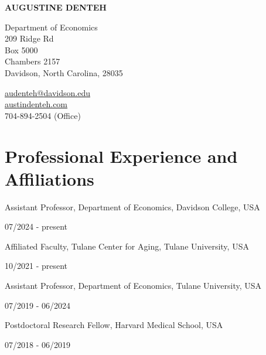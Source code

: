 \documentclass[12pt,letterpaper]{article}
\def\name{Augustine Denteh}
\newcommand{\titlefont}[1]{{\titleface\bfseries\Large\MakeUppercase{#1}}}
\renewenvironment{itemize}{
	\begin{list}{}{
			\setlength{\leftmargin}{1em}
			\setlength{\itemsep}{0.15em}
			\setlength{\parskip}{0pt}
			\setlength{\parsep}{0.2em}
		}
	}{
	\end{list}
}
\newcommand{\resitemwithdate}[2]{%
	\item 
	\begin{minipage}[t]{.75\linewidth}
		\raggedright #1%
	\end{minipage}
	\hfill
	\begin{minipage}[t]{.25\linewidth}
		\raggedright #2%
	\end{minipage}
	\vspace{-4ex}
}
\renewcommand{\today}{\ifcase \month \or January\or February\or March\or April\or May%
	\or June\or July\or August\or September\or October\or November\or December\fi%
	\space \number \year}
\begin{document}
	
	\centerline{\titlefont{\name}}
	
	
	\bigskip
	\begin{minipage}[t]{0.5\textwidth}
		Department of Economics\\
		209 Ridge Rd \\
		Box 5000 \\ 
		Chambers 2157 \\ 
		Davidson, North Carolina, 28035
	\end{minipage}
	\begin{minipage}[t]{0.5\textwidth}
			\href{mailto:audenteh@davidson.edu}{ \hspace{4cm} audenteh@davidson.edu}\\
			\href{http://austindenteh.com/}{ \hspace{4cm} austindenteh.com} \\ 
		    \hspace*{4cm} 704-894-2504 (Office)
	\end{minipage}

\section*{Professional Experience and Affiliations}

\begin{itemize}
\resitemwithdate{Assistant Professor, Department of Economics, Davidson College, USA}{\hspace{0.5cm} 07/2024 - present}
\resitemwithdate{Affiliated Faculty, Tulane Center for Aging, Tulane University, USA}{\hspace{0.5cm} 10/2021 - present }
\resitemwithdate{Assistant Professor, Department of Economics, Tulane University, USA}{\hspace{0.5cm} 07/2019 - 06/2024}
\resitemwithdate{Postdoctoral Research Fellow, Harvard Medical School, USA}{\hspace{0.5cm} 07/2018 - 06/2019 }
\end{itemize}
\end{document}
